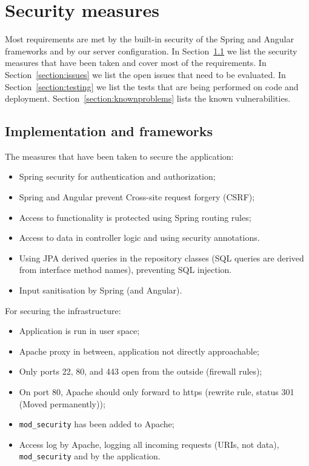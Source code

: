 \documentclass[a4paper]{report}
\begin{document}
\chapter{Security measures}\label{chapter:measures}

Most requirements are met by the built-in security of the Spring and Angular
frameworks and by our server configuration. 
In Section~\ref{section:implementation} we list the security measures that have been
taken and cover most of the requirements. 
In Section~\ref{section:issues} we list the open issues that need to be evaluated.
In Section~\ref{section:testing} we list the tests that are being performed on
code and deployment.
Section~\ref{section:knownproblems} lists the known vulnerabilities.


\section{Implementation and frameworks}\label{section:implementation}

The measures that have been taken to secure the application:
\begin{itemize}
\item Spring security for authentication and authorization;
\item Spring and Angular prevent Cross-site request forgery (CSRF);
\item Access to functionality is protected using Spring routing rules;
\item Access to data in controller logic and using security annotations.
\item Using JPA derived queries in the repository classes 
(SQL queries are derived from interface method names), preventing SQL injection.
\item Input sanitisation by Spring (and Angular).
\end{itemize}

For securing the infrastructure:
\begin{itemize}
\item Application is run in user space;
\item Apache proxy in between, application not directly approachable;
\item Only ports 22, 80, and 443 open from the outside (firewall rules);
\item On port 80, Apache should only forward to https (rewrite rule, 
status 301 (Moved permanently));
\item \texttt{mod\_security} has been added to Apache;
\item Access log by Apache, logging all incoming requests (URIs, not data),
\texttt{mod\_security} and by the application.
\end{itemize}
\end{document}
